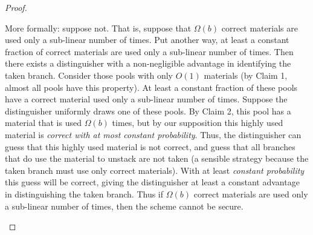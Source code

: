 \begin{proof}
\begin{itemize}
\begin{subproof}
    More formally: suppose not.
    That is, suppose that $\Omega(b)$ correct materials are used only a
    sub-linear number of times.
    Put another way, at least a constant fraction of correct materials are used only a
    sub-linear number of times.
    Then there exists a distinguisher with a non-negligible advantage
    in identifying the taken branch.
    Consider those pools with
    only $O(1)$ materials (by Claim 1, almost all pools have this
    property). At least a constant fraction of
    these pools have a correct material used only a sub-linear
    number of times.
    Suppose the distinguisher uniformly draws one of these pools.
    By Claim 2, this pool has a material that is used $\Omega(b)$
    times, but by our supposition this highly used material is
    \emph{correct with at most constant probability}.
    Thus, the distinguisher can guess that this highly used material
    is not correct, and guess that all branches that do use the
    material to unstack are not taken (a sensible strategy because the
    taken branch must use only correct materials).
    With at least \emph{constant probability} this guess will be correct,
    giving the distinguisher at least a constant advantage in distinguishing
    the taken branch.
    Thus if $\Omega(b)$ correct materials are used only a
    sub-linear number of times, then the scheme cannot be secure.
  \end{subproof}
\end{itemize}


\end{proof}
